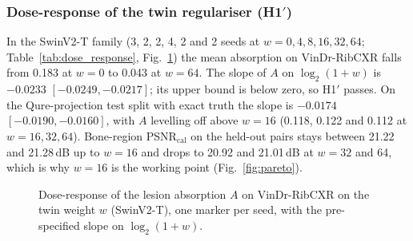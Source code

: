 \begin{table}[!t]
\centering
\caption{SAP\_v5 hypotheses (exploratory): paired differences with image bootstrap (H16, H16b, H17: one-sided 95\,\% lower bounds) or
image-cluster bootstrap intervals (absorption on 1,470 VinDr-RibCXR sites), \num{10000} resamples.}
\label{tab:sitecal_tests}
\end{table}

\begin{table}[!t]
\centering
\caption{VinDr-RibCXR (metrics only): mean lesion absorption of one audit run with all four models (shared sites) and the rib benchmark,
as is and site-calibrated (exploratory, SAP\_v5).}
\label{tab:sitecal_ribcxr}
\end{table}

\subsubsection{Dose-response of the twin regulariser (H1$'$)}
In the SwinV2-T family (3, 2, 2, 4, 2 and 2 seeds at $w=0,4,8,16,32,64$; Table~\ref{tab:dose_response}, Fig.~\ref{fig:dose_response}) the
mean absorption on VinDr-RibCXR falls from 0.183 at $w=0$ to 0.043 at $w=64$. The slope of $A$ on $\log_2(1+w)$ is $-0.0233$
$[-0.0249,-0.0217]$; its upper bound is below zero, so H1$'$ passes. On the Qure-projection test split with exact truth the slope is
$-0.0174$ $[-0.0190,-0.0160]$, with $A$ levelling off above $w=16$ (0.118, 0.122 and 0.112 at $w=16,32,64$). Bone-region
PSNR$_{\mathrm{cal}}$ on the held-out pairs stays between 21.22 and 21.28\,dB up to $w=16$ and drops to 20.92 and 21.01\,dB at $w=32$ and
64, which is why $w=16$ is the working point (Fig.~\ref{fig:pareto}).

\begin{table}[!t]
\centering
\caption{Dose-response of the lesion absorption on the twin weight (SwinV2-T family): seeds per weight, mean $A$ on VinDr-RibCXR and on the
Qure-projection test split, and the pre-specified slope with its image-cluster bootstrap interval. Each weight averages all of its seeds
(four at $w=16$, seeds 0--3); the encoder comparisons use seeds 0--2 only.}
\label{tab:dose_response}
\end{table}

\begin{figure}[!t]
\centering
{}
\caption{Dose-response of the lesion absorption $A$ on VinDr-RibCXR on the twin weight $w$ (SwinV2-T), one marker per seed, with the
pre-specified slope on $\log_2(1+w)$.}
\label{fig:dose_response}
\end{figure}

